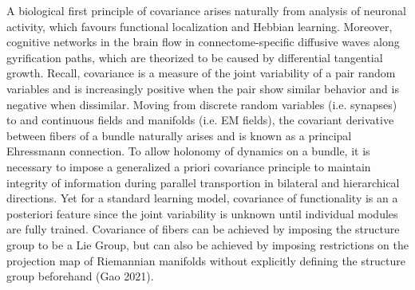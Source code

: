 \documentclass{article}
\begin{document}
   A biological first principle of covariance arises naturally from analysis of neuronal activity, which favours functional localization and Hebbian learning.
    Moreover, cognitive networks in the brain flow in connectome-specific diffusive waves along gyrification paths, which are theorized to be caused by differential tangential growth. 
    Recall, covariance is a measure of the joint variability of a pair random variables and is increasingly positive when the pair show similar behavior and is negative when dissimilar.
    Moving from discrete random variables (i.e. synapses) to  and continuous fields and manifolds (i.e. EM fields), the covariant derivative between fibers of a bundle naturally arises and is known as a principal Ehressmann connection. To allow holonomy of dynamics on a bundle, it is necessary to impose a generalized a priori covariance principle to maintain integrity of information during parallel transportion in bilateral and hierarchical directions.
    Yet for a standard learning model, covariance of functionality is an a posteriori feature since the joint variability is unknown until individual modules are fully trained. 
    Covariance of fibers can be achieved by imposing the structure group to be a Lie Group, but can also be achieved by imposing restrictions on the projection map of Riemannian manifolds without explicitly defining the structure group beforehand (Gao 2021).
    
    

    
    
\end{document}
